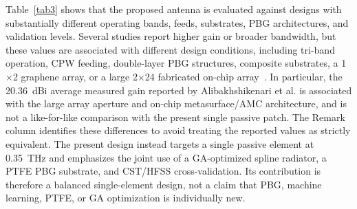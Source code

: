 \documentclass[a4paper,fleqn]{cas-dc}
\begin{document}
Table~\ref{tab3} shows that the proposed antenna is evaluated against designs with substantially different operating bands, feeds, substrates, PBG architectures, and validation levels. Several studies report higher gain or broader bandwidth, but these values are associated with different design conditions, including tri-band operation, CPW feeding, double-layer PBG structures, composite substrates, a 1$\times$2 graphene array, or a large 2$\times$24 fabricated on-chip array~\cite{li_triband_2024,babaahmed_hybrid_2025,boujmil_pbg_2025,bouzid_pbg_2025,reguig_pbg_ml_2026,alibakhshikenari_thz_array_2023}. In particular, the 20.36~dBi average measured gain reported by Alibakhshikenari et al. is associated with the large array aperture and on-chip metasurface/AMC architecture, and is not a like-for-like comparison with the present single passive patch. The Remark column identifies these differences to avoid treating the reported values as strictly equivalent. The present design instead targets a single passive element at 0.35~THz and emphasizes the joint use of a GA-optimized spline radiator, a PTFE PBG substrate, and CST/HFSS cross-validation. Its contribution is therefore a balanced single-element design, not a claim that PBG, machine learning, PTFE, or GA optimization is individually new.
\end{document}
